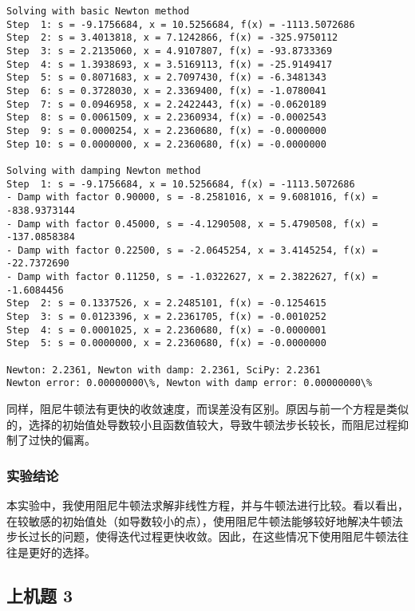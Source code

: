 \documentclass[11pt]{ctexart}
\begin{document}
    \begin{Verbatim}[commandchars=\\\{\}]
Solving with basic Newton method
Step  1: s = -9.1756684, x = 10.5256684, f(x) = -1113.5072686
Step  2: s = 3.4013818, x = 7.1242866, f(x) = -325.9750112
Step  3: s = 2.2135060, x = 4.9107807, f(x) = -93.8733369
Step  4: s = 1.3938693, x = 3.5169113, f(x) = -25.9149417
Step  5: s = 0.8071683, x = 2.7097430, f(x) = -6.3481343
Step  6: s = 0.3728030, x = 2.3369400, f(x) = -1.0780041
Step  7: s = 0.0946958, x = 2.2422443, f(x) = -0.0620189
Step  8: s = 0.0061509, x = 2.2360934, f(x) = -0.0002543
Step  9: s = 0.0000254, x = 2.2360680, f(x) = -0.0000000
Step 10: s = 0.0000000, x = 2.2360680, f(x) = -0.0000000

Solving with damping Newton method
Step  1: s = -9.1756684, x = 10.5256684, f(x) = -1113.5072686
- Damp with factor 0.90000, s = -8.2581016, x = 9.6081016, f(x) = -838.9373144
- Damp with factor 0.45000, s = -4.1290508, x = 5.4790508, f(x) = -137.0858384
- Damp with factor 0.22500, s = -2.0645254, x = 3.4145254, f(x) = -22.7372690
- Damp with factor 0.11250, s = -1.0322627, x = 2.3822627, f(x) = -1.6084456
Step  2: s = 0.1337526, x = 2.2485101, f(x) = -0.1254615
Step  3: s = 0.0123396, x = 2.2361705, f(x) = -0.0010252
Step  4: s = 0.0001025, x = 2.2360680, f(x) = -0.0000001
Step  5: s = 0.0000000, x = 2.2360680, f(x) = -0.0000000

Newton: 2.2361, Newton with damp: 2.2361, SciPy: 2.2361
Newton error: 0.00000000\%, Newton with damp error: 0.00000000\%

    \end{Verbatim}

    同样，阻尼牛顿法有更快的收敛速度，而误差没有区别。原因与前一个方程是类似的，选择的初始值处导数较小且函数值较大，导致牛顿法步长较长，而阻尼过程抑制了过快的偏离。

    \subsubsection{实验结论}\label{ux5b9eux9a8cux7ed3ux8bba}

本实验中，我使用阻尼牛顿法求解非线性方程，并与牛顿法进行比较。看以看出，在较敏感的初始值处（如导数较小的点），使用阻尼牛顿法能够较好地解决牛顿法步长过长的问题，使得迭代过程更快收敛。因此，在这些情况下使用阻尼牛顿法往往是更好的选择。

    \subsection{上机题 3}\label{ux4e0aux673aux9898-3}
\end{document}
